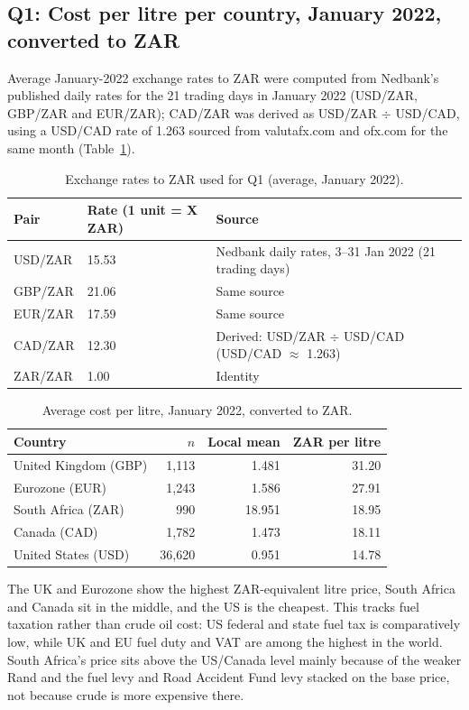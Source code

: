 \documentclass{article}
\begin{document}
\subsection{Q1: Cost per litre per country, January 2022, converted to ZAR}
\label{sec:4.2.1}

Average January-2022 exchange rates to ZAR were computed from Nedbank's published daily
rates for the 21 trading days in January 2022 (USD/ZAR, GBP/ZAR and EUR/ZAR); CAD/ZAR
was derived as USD/ZAR $\div$ USD/CAD, using a USD/CAD rate of 1.263 sourced from
valutafx.com and ofx.com for the same month (Table~\ref{tab:fx}).

\begin{table}[h]
  \caption{Exchange rates to ZAR used for Q1 (average, January 2022).}
  \label{tab:fx}
  \centering
  \begin{tabular}{lll}
    \toprule
    Pair & Rate (1 unit = X ZAR) & Source \\
    \midrule
    USD/ZAR & 15.53 & Nedbank daily rates, 3--31 Jan 2022 (21 trading days) \\
    GBP/ZAR & 21.06 & Same source \\
    EUR/ZAR & 17.59 & Same source \\
    CAD/ZAR & 12.30 & Derived: USD/ZAR $\div$ USD/CAD (USD/CAD $\approx$ 1.263) \\
    ZAR/ZAR & 1.00 & Identity \\
    \bottomrule
  \end{tabular}
\end{table}

\begin{table}[h]
  \caption{Average cost per litre, January 2022, converted to ZAR.}
  \label{tab:q1}
  \centering
  \begin{tabular}{lrrr}
    \toprule
    Country & $n$ & Local mean & ZAR per litre \\
    \midrule
    United Kingdom (GBP) & 1{,}113 & 1.481 & 31.20 \\
    Eurozone (EUR) & 1{,}243 & 1.586 & 27.91 \\
    South Africa (ZAR) & 990 & 18.951 & 18.95 \\
    Canada (CAD) & 1{,}782 & 1.473 & 18.11 \\
    United States (USD) & 36{,}620 & 0.951 & 14.78 \\
    \bottomrule
  \end{tabular}
\end{table}

The UK and Eurozone show the highest ZAR-equivalent litre price, South Africa and Canada
sit in the middle, and the US is the cheapest. This tracks fuel taxation rather than
crude oil cost: US federal and state fuel tax is comparatively low, while UK and EU fuel
duty and VAT are among the highest in the world. South Africa's price sits above the
US/Canada level mainly because of the weaker Rand and the fuel levy and Road Accident
Fund levy stacked on the base price, not because crude is more expensive there.
\end{document}
